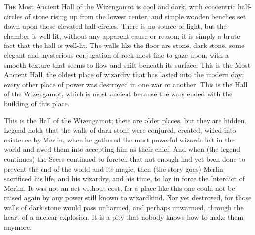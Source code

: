 
\lettrine{T}{he} Most Ancient
Hall of the Wizengamot is cool and dark, with concentric half-circles of stone
rising up from the lowest center, and simple wooden benches set down upon those
elevated half-circles. There is no source of light, but the chamber is
well-lit, without any apparent cause or reason; it is simply a brute fact that
the hall is well-lit. The walls like the floor are stone, dark stone, some
elegant and mysterious conjugation of rock most fine to gaze upon, with a
smooth texture that seems to flow and shift beneath its surface. This is the
Most Ancient Hall, the oldest place of wizardry that has lasted into the modern
day; every other place of power was destroyed in one war or another. This is
the Hall of the Wizengamot, which is most ancient because the wars ended with
the building of this place.

This is the Hall of the Wizengamot; there are older places, but they are
hidden. Legend holds that the walls of dark stone were conjured, created,
willed into existence by Merlin, when he gathered the most powerful wizards
left in the world and awed them into accepting him as their chief. And when
(the legend continues) the Seers continued to foretell that not enough had yet
been done to prevent the end of the world and its magic, then (the story goes)
Merlin sacrificed his life, and his wizardry, and his time, to lay in force the
Interdict of Merlin. It was not an act without cost, for a place like this one
could not be raised again by any power still known to wizardkind. Nor yet
destroyed, for those walls of dark stone would pass unharmed, and perhaps
unwarmed, through the heart of a nuclear explosion. It is a pity that nobody
knows how to make them anymore.

